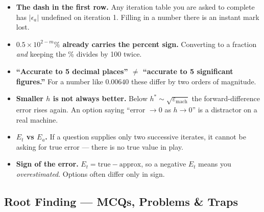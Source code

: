 \begin{trapbox}
\begin{itemize}
\item \textbf{The dash in the first row.} Any iteration table you are asked to complete has $|\epsilon_a|$ undefined on iteration 1. Filling in a number there is an instant mark lost.
\item \textbf{$0.5\times10^{2-m}\%$ already carries the percent sign.} Converting to a fraction \emph{and} keeping the \% divides by 100 twice.
\item \textbf{``Accurate to 5 decimal places'' $\ne$ ``accurate to 5 significant figures.''} For a number like $0.00640$ these differ by two orders of magnitude.
\item \textbf{Smaller $h$ is not always better.} Below $h^\ast\sim\sqrt{\varepsilon_{\text{mach}}}$ the forward-difference error rises again. An option saying ``error $\to 0$ as $h\to0$'' is a distractor on a real machine.
\item \textbf{$E_t$ vs $E_a$.} If a question supplies only two successive iterates, it cannot be asking for true error --- there is no true value in play.
\item \textbf{Sign of the error.} $E_t = \text{true} - \text{approx}$, so a negative $E_t$ means you \emph{overestimated}. Options often differ only in sign.
\end{itemize}
\end{trapbox}

\subsection{Root Finding --- MCQs, Problems \& Traps}

